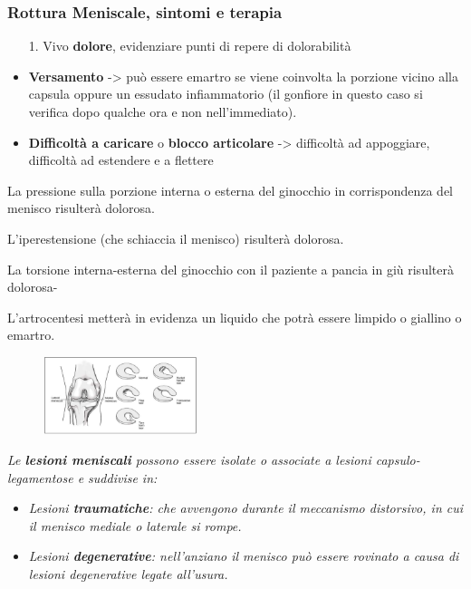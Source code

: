 \subsubsection{Rottura Meniscale, sintomi e terapia}

\begin{itemize}
\item[1.]
  Vivo \textbf{dolore}, evidenziare punti di repere di dolorabilità
\item
  \textbf{Versamento} -> può essere emartro se viene coinvolta la porzione vicino alla capsula oppure un essudato infiammatorio (il gonfiore in questo caso si verifica dopo qualche ora e non nell'immediato).
\item
  \textbf{Difficoltà a caricare} o \textbf{blocco articolare} -> difficoltà ad appoggiare, difficoltà ad estendere e a flettere
\end{itemize}

La pressione sulla porzione interna o esterna del ginocchio in corrispondenza del menisco risulterà dolorosa.

L'iperestensione (che schiaccia il menisco) risulterà dolorosa.

La torsione interna-esterna del ginocchio con il paziente a pancia in giù risulterà dolorosa-

L'artrocentesi metterà in evidenza un liquido che potrà essere limpido o giallino o emartro.

\begin{figure}[!ht]
\centering
\includegraphics[width=0.4\textwidth]{009/image13.png}
\end{figure}

\emph{Le \textbf{lesioni meniscali} possono essere isolate o associate a lesioni capsulo-legamentose e suddivise in:}

\begin{itemize}
\item
  \emph{Lesioni \textbf{traumatiche}: che avvengono durante il meccanismo distorsivo, in cui il menisco mediale o laterale si rompe.}
\item
  \emph{Lesioni \textbf{degenerative}: nell'anziano il menisco può essere rovinato a causa di lesioni degenerative legate all'usura.}
\end{itemize}

